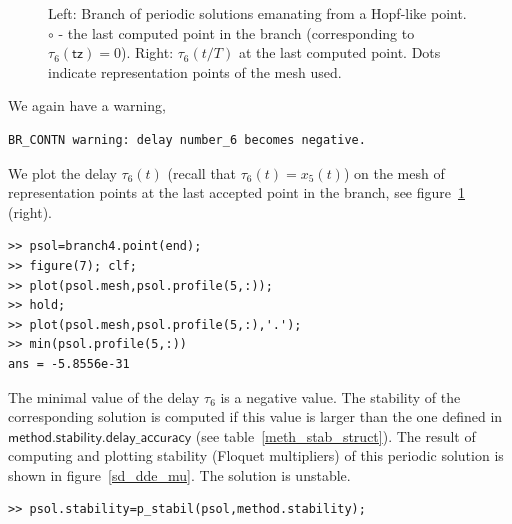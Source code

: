 \documentclass[10pt]{article}
\gdef \parm#1{{\mathsf{#1}}}
\begin{document}
{\begin{figure}[h]
\begin{center}
\end{center}
\caption{\small\label{br_ps_sd2}Left: Branch of periodic solutions emanating
from a Hopf-like point. $\circ$ - the last computed point in the branch
(corresponding to $\tau_6(\parm{tz})=0$). Right: $\tau_6(t/T)$ at 
the last computed point. Dots indicate representation points
of the mesh used.}
\end{figure}
We again have a warning,
{\small\begin{verbatim}
BR_CONTN warning: delay number_6 becomes negative.
\end{verbatim}}
We plot the delay $\tau_6(t)$ (recall that $\tau_6(t)=x_5(t)$)
on the mesh of representation points at the last accepted point 
in the branch, see figure~\ref{br_ps_sd2} (right).
{\small\begin{verbatim}
>> psol=branch4.point(end); 
>> figure(7); clf;
>> plot(psol.mesh,psol.profile(5,:));
>> hold;
>> plot(psol.mesh,psol.profile(5,:),'.');
>> min(psol.profile(5,:)) 
ans = -5.8556e-31
\end{verbatim}}
The minimal value of the delay $\tau_6$ is a negative value. 
The stability of the corresponding solution is computed if this 
value is larger 
than the one defined in $\parm{method.stability.delay\_accuracy}$
(see table~\ref{meth_stab_struct}).
The result of computing and plotting stability (Floquet multipliers) 
of this periodic solution is shown in 
figure~\ref{sd_dde_mu}. The solution is unstable.
{\small\begin{verbatim}
>> psol.stability=p_stabil(psol,method.stability);

\end{verbatim}}}
\end{document}
